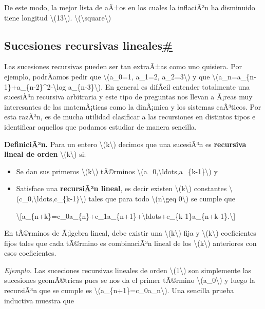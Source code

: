 De este modo, la mejor lista de aÃ±os en los cuales la inflaciÃ³n ha
disminuido tiene longitud {\textbackslash(13\textbackslash)}.
{{\textbackslash(\textbackslash square\textbackslash)}}

\subsection{\texorpdfstring{Sucesiones recursivas
lineales\hyperref[sucesiones-recursivas-lineales]{\#}}{Sucesiones recursivas lineales\#}}\label{sucesiones-recursivas-lineales}

Las sucesiones recursivas pueden ser tan extraÃ±as como uno quisiera.
Por ejemplo, podrÃ­amos pedir que {\textbackslash(a\_0=1, a\_1=2,
a\_2=3\textbackslash)} y que
{\textbackslash(a\_n=a\_\{n-1\}+a\_\{n-2\}\^{}2-\textbackslash log
a\_\{n-3\}\textbackslash)}. En general es difÃ­cil entender totalmente
una sucesiÃ³n recursiva arbitraria y este tipo de preguntas nos llevan a
Ã¡reas muy interesantes de las matemÃ¡ticas como la dinÃ¡mica y los
sistemas caÃ³ticos. Por esta razÃ³n, es de mucha utilidad clasificar a
las recursiones en distintos tipos e identificar aquellos que podamos
estudiar de manera sencilla.

\textbf{DefiniciÃ³n.} Para un entero {\textbackslash(k\textbackslash)}
decimos que una sucesiÃ³n es \textbf{recursiva lineal de orden}
{\textbackslash(k\textbackslash)} si:

\begin{itemize}
\item
  Se dan sus primeros {\textbackslash(k\textbackslash)} tÃ©rminos
  {\textbackslash(a\_0,\textbackslash ldots,a\_\{k-1\}\textbackslash)} y
\item
  Satisface una \textbf{recursiÃ³n lineal}, es decir existen
  {\textbackslash(k\textbackslash)} constantes
  {\textbackslash(c\_0,\textbackslash ldots,c\_\{k-1\}\textbackslash)}
  tales que para todo {\textbackslash(n\textbackslash geq
  0\textbackslash)} se cumple que

  \textbackslash{[}a\_\{n+k\}=c\_0a\_\{n\}+c\_1a\_\{n+1\}+\textbackslash ldots+c\_\{k-1\}a\_\{n+k-1\}.\textbackslash{]}
\end{itemize}

En tÃ©rminos de Ã¡lgebra lineal, debe existir una
{\textbackslash(k\textbackslash)} fija y
{\textbackslash(k\textbackslash)} coeficientes fijos tales que cada
tÃ©rmino es combinaciÃ³n lineal de los {\textbackslash(k\textbackslash)}
anteriores con esos coeficientes.

\emph{Ejemplo.} Las suceciones recursivas lineales de orden
{\textbackslash(1\textbackslash)} son simplemente las sucesiones
geomÃ©tricas pues se nos da el primer tÃ©rmino
{\textbackslash(a\_0\textbackslash)} y luego la recursiÃ³n que se cumple
es {\textbackslash(a\_\{n+1\}=c\_0a\_n\textbackslash)}. Una sencilla
prueba inductiva muestra que

